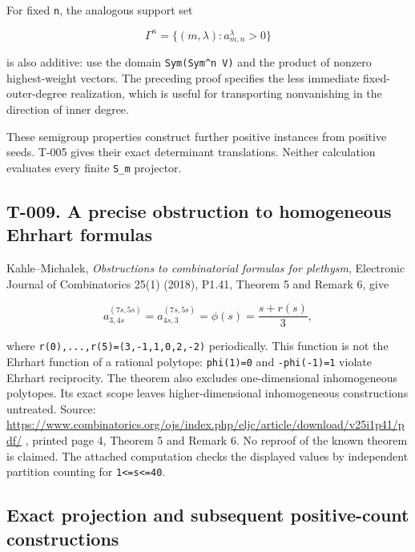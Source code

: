 \documentclass[
  10pt,
]{article}
\begin{document}
For fixed \texttt{\small n}, the analogous support set

\[
\Gamma^{n}=\{(m,\lambda):a_{m,n}^\lambda>0\}
\]

is also additive: use the domain
\texttt{\small Sym(\allowbreak{}Sym\textasciicircum{}n V)\allowbreak{}}
and the product of nonzero highest-weight vectors. The preceding proof
specifies the less immediate fixed-outer-degree realization, which is
useful for transporting nonvanishing in the direction of inner degree.

These semigroup properties construct further positive instances from
positive seeds. T-005 gives their exact determinant translations.
Neither calculation evaluates every finite
\texttt{\small S\_\allowbreak{}m} projector.

\subsection{T-009. A precise obstruction to homogeneous Ehrhart
formulas}\label{t-009.-a-precise-obstruction-to-homogeneous-ehrhart-formulas}

Kahle--Michałek, \emph{Obstructions to combinatorial formulas for
plethysm}, Electronic Journal of Combinatorics 25(1) (2018), P1.41,
Theorem 5 and Remark 6, give

\[
a_{3,4s}^{(7s,5s)}=a_{4s,3}^{(7s,5s)}
=\phi(s)=\frac{s+r(s)}3,
\]

where
\texttt{\small r(\allowbreak{}0)\allowbreak{},\allowbreak{}...,\allowbreak{}r(\allowbreak{}5)\allowbreak{}=\allowbreak{}(\allowbreak{}3,\allowbreak{}-\allowbreak{}1,\allowbreak{}1,\allowbreak{}0,\allowbreak{}2,\allowbreak{}-\allowbreak{}2)\allowbreak{}}
periodically. This function is not the Ehrhart function of a rational
polytope:
\texttt{\small phi(\allowbreak{}1)\allowbreak{}=\allowbreak{}0} and
\texttt{\small -\allowbreak{}phi(\allowbreak{}-\allowbreak{}1)\allowbreak{}=\allowbreak{}1}
violate Ehrhart reciprocity. The theorem also excludes one-dimensional
inhomogeneous polytopes. Its exact scope leaves higher-dimensional
inhomogeneous constructions untreated. Source:
\url{https://www.combinatorics.org/ojs/index.php/eljc/article/download/v25i1p41/pdf/}
, printed page 4, Theorem 5 and Remark 6. No reproof of the known
theorem is claimed. The attached computation checks the displayed values
by independent partition counting for
\texttt{\small 1<=\allowbreak{}s<=\allowbreak{}40}.

\subsection{Exact projection and subsequent positive-count
constructions}\label{exact-projection-and-subsequent-positive-count-constructions}
\end{document}
